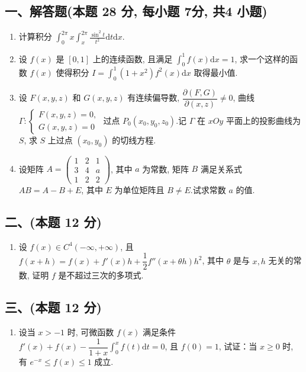 \subsection*{一、解答题(本题 28 分,  每小题 7分,  共4 小题)}
\begin{enumerate}
    \item 计算积分 $\displaystyle\int_0^{2\pi} x \int_x^{2\pi} \frac{\sin^2 t}{t^2} \mathrm{d}t \mathrm{d}x$.
    \item 设 $f(x)$ 是 $[0,1]$ 上的连续函数, 且满足 $\displaystyle\int_0^1 f(x) \mathrm{d}x = 1$, 求一个这样的函数 $f(x)$ 使得积分 $I = \displaystyle\int_0^1 (1+x^2)f^2(x) \mathrm{d}x$ 取得最小值.
    \item 设 $F(x,y,z)$ 和 $G(x,y,z)$ 有连续偏导数, $\dfrac{\partial(F,G)}{\partial(x,z)} \neq 0$, 曲线 $\Gamma: \begin{cases} F(x,y,z) = 0, \\ G(x,y,z) = 0 \end{cases}$ 过点 $P_0(x_0,y_0,z_0)$.记 $\Gamma$ 在 $xOy$ 平面上的投影曲线为 $S$, 求 $S$ 上过点 $(x_0,y_0)$ 的切线方程.
    \item 设矩阵 $A = \begin{pmatrix}
                  1 & 2 & 1 \\
                  3 & 4 & a \\
                  1 & 2 & 2
              \end{pmatrix}$, 其中 $a$ 为常数, 矩阵 $B$ 满足关系式 $AB = A - B + E$, 其中 $E$ 为单位矩阵且 $B \neq E$.试求常数 $a$ 的值.
\end{enumerate}

\subsection*{二、(本题 12 分)}
\begin{enumerate}[start=5]
    \item 设 $f(x) \in C^4(-\infty, +\infty)$, 且 $f(x+h) = f(x) + f'(x)h + \dfrac{1}{2}f''(x+\theta h)h^2$, 其中 $\theta$ 是与 $x, h$ 无关的常数, 证明 $f$ 是不超过三次的多项式.
\end{enumerate}

\subsection*{三、(本题 12 分)}
\begin{enumerate}[start=6]
    \item 设当 $x > -1$ 时, 可微函数 $f(x)$ 满足条件 $f'(x) + f(x) - \dfrac{1}{1+x} \displaystyle\int_0^x f(t) \mathrm{d}t = 0$, 且 $f(0) = 1$, 试证：当 $x \geqslant 0$ 时, 有 $e^{-x} \leqslant f(x) \leqslant 1$ 成立.
\end{enumerate}


